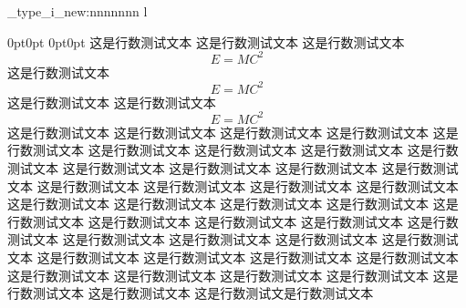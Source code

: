 \documentclass[a4paper,fontset = windowsnew]{ctexbook}
\begin{document}
 \cexam_type_i_new:nnnnnnn
 {l}
 {
 }
 {0pt}{0pt}
 {0pt}{0pt}
 {
    这是行数测试文本
    这是行数测试文本
    这是行数测试文本
    \begin{equation}
      E=MC^2
    \end{equation}
    这是行数测试文本
    \begin{equation}
      E=MC^2
    \end{equation}
    这是行数测试文本
    这是行数测试文本
    \begin{equation}
      E=MC^2
    \end{equation}
    这是行数测试文本
    这是行数测试文本
    这是行数测试文本
    这是行数测试文本
    这是行数测试文本
    这是行数测试文本
    这是行数测试文本
    这是行数测试文本
    这是行数测试文本
    这是行数测试文本
    这是行数测试文本
    这是行数测试文本
    这是行数测试文本
    这是行数测试文本
    这是行数测试文本
    这是行数测试文本
    这是行数测试文本
    这是行数测试文本
    这是行数测试文本
    这是行数测试文本
    这是行数测试文本
    这是行数测试文本
    这是行数测试文本
    这是行数测试文本
    这是行数测试文本
    这是行数测试文本
    这是行数测试文本
    这是行数测试文本
    这是行数测试文本
    这是行数测试文本
    这是行数测试文本
    这是行数测试文本
    这是行数测试文本
    这是行数测试文本
    这是行数测试文本
    这是行数测试文本
    这是行数测试文本
    这是行数测试文本
    这是行数测试文本
    这是行数测试文本
    这是行数测试文是行数测试文本
  }

    
\end{document}
